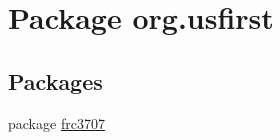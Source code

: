 \hypertarget{namespaceorg_1_1usfirst}{}\section{Package org.\+usfirst}
\label{namespaceorg_1_1usfirst}
\subsection*{Packages}
\begin{DoxyCompactItemize}
\item 
package \mbox{\hyperlink{namespaceorg_1_1usfirst_1_1frc3707}{frc3707}}
\end{DoxyCompactItemize}
